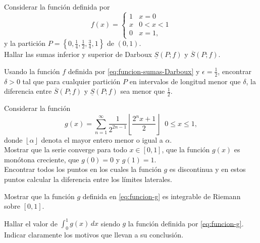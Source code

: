 \documentclass{book}
\begin{document}
\begin{ejer}{} Considerar la función definida por 
\begin{equation}\label{eq:funcion-sumas-Darboux}
f(x)=\left
\{\begin{array}{ll}
1&x=0\\
x&0<x<1\\
0&x=1,
\end{array}
\right.
\end{equation}
y la partición $P=\left\{0,\frac{1}{4},\frac{1}{2},\frac{3}{4},1\right\}$ de $(0,1)$. 
\\
Hallar las sumas inferior y superior de Darboux $\underline{S}(P;f)$ y $\overline{S}(P;f)$.

\end{ejer}  

\begin{ejer}{} Usando la función $f$ definida por \eqref{eq:funcion-sumas-Darboux} y $\epsilon=\frac{1}{2}$, 
encontrar $\delta>0$ tal que para cualquier partición $P$ en intervalos de longitud menor que $\delta$, 
la diferencia entre $\overline{S}(P;f)$ y $\underline{S}(P;f)$ sea menor que $\frac{1}{2}$.

\end{ejer} 

\begin{ejer}{} Considerar la función 
\begin{equation}\label{eq:funcion-g}
g(x)=\sum_{n=1}^{\infty} \frac{1}{2^{2n-1}}\left\lfloor \frac{2^nx+1}{2}\right\rfloor\;\;0\leq x\leq 1,
\end{equation}
donde $\left\lfloor\alpha\right\rfloor$ denota el mayor entero menor o igual a $\alpha$.
\\
Mostrar que la serie converge para todo $x \in [0,1]$, que la función $g(x)$ es monótona creciente, que 
$g(0)=0$ y $g(1)=1$.
\\
Encontrar todos los puntos en los cuales la función $g$ es discontinua y en estos puntos calcular la diferencia
entre los límites laterales.
\end{ejer} 

\begin{ejer}{} Mostrar que la función $g$ definida en   \eqref{eq:funcion-g} es integrable de Riemann sobre $[0,1]$.
\end{ejer} 

\begin{ejer}{} Hallar el valor de $\int_0^1 g(x)\,dx$ siendo $g$ la función definida por \eqref{eq:funcion-g}. 
Indicar claramente los motivos que llevan a su conclusión.
\end{ejer}  
\end{document}
